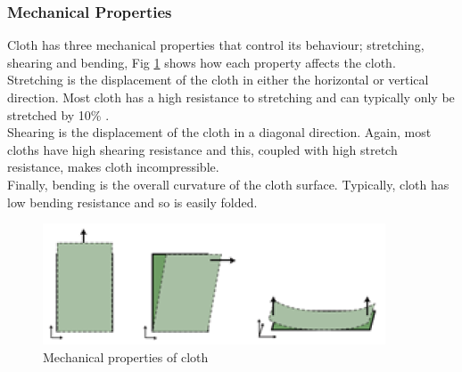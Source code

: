 \subsubsection{Mechanical Properties}
Cloth has three mechanical properties that control its behaviour; stretching, shearing and bending, Fig \ref{fig:mechanical properties} shows how each property affects the cloth.
\\Stretching is the displacement of the cloth in either the horizontal or vertical direction. Most cloth has a high resistance to stretching and can typically only be stretched by 10\% \parencites[1]{Yalcn}[4]{Provot2001}.
\\Shearing is the displacement of the cloth in a diagonal direction. Again, most cloths have high shearing resistance and this, coupled with high stretch resistance, makes cloth incompressible.
\\Finally, bending is the overall curvature of the cloth surface. Typically, cloth has low bending resistance and so is easily folded.
\begin{figure}[tp]
   \begin{center}
     \includegraphics{Figures/mechanical_properties}
   \end{center}
   \caption[Mechanical properties of cloth]{Mechanical properties of cloth \parencite[1]{Yalcn}}
   \label{fig:mechanical properties}
\end{figure}

